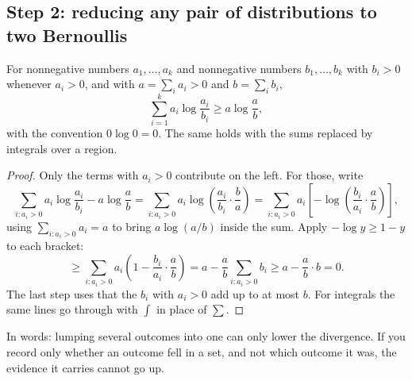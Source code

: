 \subsection*{Step 2: reducing any pair of distributions to two Bernoullis}

\begin{lemma}
\label{lem:log-sum}
For nonnegative numbers $a_1, \ldots, a_k$ and nonnegative numbers $b_1, \ldots, b_k$ with $b_i > 0$ whenever $a_i > 0$, and with $a = \sum_i a_i > 0$ and $b = \sum_i b_i$,
\[
\sum_{i=1}^k a_i \log\frac{a_i}{b_i} \geq a \log\frac{a}{b},
\]
with the convention $0 \log 0 = 0$.
The same holds with the sums replaced by integrals over a region.
\end{lemma}

\begin{proof}
Only the terms with $a_i > 0$ contribute on the left. For those, write
\[
\sum_{i: a_i > 0} a_i \log\frac{a_i}{b_i} - a\log\frac{a}{b} = \sum_{i: a_i > 0} a_i \log\left( \frac{a_i}{b_i} \cdot \frac{b}{a} \right) = \sum_{i: a_i > 0} a_i \left[ -\log\left( \frac{b_i}{a_i} \cdot \frac{a}{b} \right) \right],
\]
using $\sum_{i: a_i > 0} a_i = a$ to bring $a\log(a/b)$ inside the sum.
Apply $-\log y \geq 1 - y$ to each bracket:
\[
\geq \sum_{i: a_i > 0} a_i \left( 1 - \frac{b_i}{a_i}\cdot\frac{a}{b} \right) = a - \frac{a}{b}\sum_{i: a_i > 0} b_i \geq a - \frac{a}{b} \cdot b = 0.
\]
The last step uses that the $b_i$ with $a_i > 0$ add up to at most $b$.
For integrals the same lines go through with $\int$ in place of $\sum$.
\end{proof}

In words: lumping several outcomes into one can only lower the divergence.
If you record only whether an outcome fell in a set, and not which outcome it was, the evidence it carries cannot go up.

